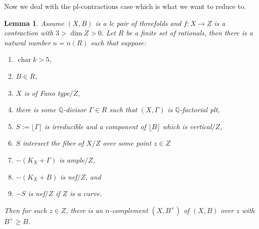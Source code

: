 \documentclass[letterpaper,reqno,12pt]{amsart}
\DeclareMathOperator{\chara}{char}
\numberwithin{equation}{section}
\theoremstyle{plain}
\newtheorem{lemma}[theorem]{Lemma}
\begin{document}
Now we deal with the pl-contractions case which is what we want to reduce to.
\begin{lemma}
\label{plrcomp}
    Assume $(X,B)$ is a lc pair of threefolds and $f:X\to Z$ is a contraction with  $3>\dim Z>0$. Let $R$ be a finite set of rationals, then there is a natural number $n=n(R)$ such that suppose:
    \begin{enumerate}
        \item $\chara k>5$,
        \item $B\in R$,
        \item $X$ is of Fano type$/Z$,
        \item there is some ${\mathbb Q}$-divisor $\Gamma\in R$ such that $(X,\Gamma)$ is ${\mathbb Q}$-factorial plt,
        \item $S:=\lfloor \Gamma\rfloor$ is irreducible and a component of $\lfloor B\rfloor$ which is vertical$/Z$,
        \item $S$ intersect the fiber of $X/Z$ over some point $z\in Z$
        \item $-(K_X+\Gamma)$ is ample$/Z$,
        \item $-(K_X+B)$ is nef$/Z$, and
        \item $-S$ is nef$/Z$ if $Z$ is a curve.
    \end{enumerate}
    Then for such $z\in Z$, there is an $n$-complement $(X,B^+)$ of $(X,B)$ over $z$ with $B^+\geq B$.
\end{lemma}
\end{document}
